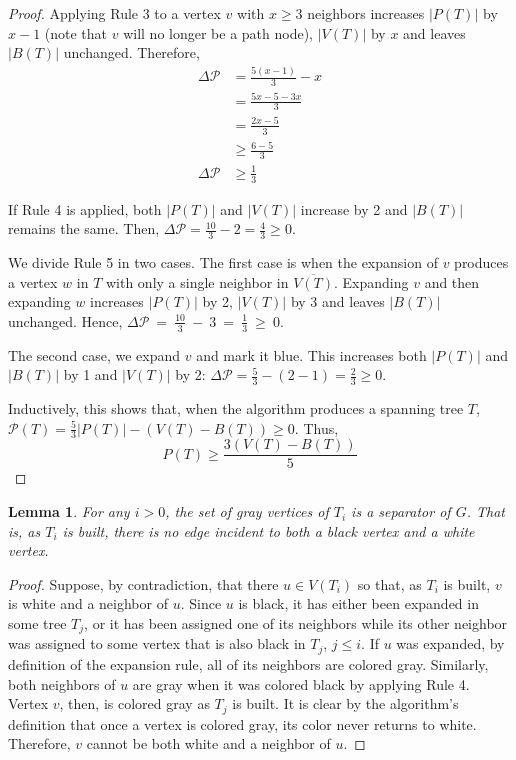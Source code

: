 \documentclass[12pt]{article}
\newtheorem{lemma}[theorem]{Lemma}
\begin{document}
\begin{proof}
  Applying Rule 3 to a vertex $v$ with $x \ge 3$ neighbors increases $|P(T)|$ by $x - 1$ (note that $v$ will no longer be a path node), $|V(T)|$ by $x$ and leaves $|B(T)|$ unchanged.
  Therefore,
  \begin{align*}
    \Delta \mathcal{P} &= \frac{5(x - 1)}{3} - x \\
                       &= \frac{5x - 5 - 3x}{3} \\
                       &= \frac{2x - 5}{3} \\
                       &\ge \frac{6 - 5}{3} \\
    \Delta \mathcal{P} &\ge \frac{1}{3}
  \end{align*}

  If Rule 4 is applied, both $|P(T)|$ and $|V(T)|$ increase by 2 and $|B(T)|$ remains the same.
  Then, $\Delta \mathcal{P} = \frac{10}{3} - 2 = \frac{4}{3} \ge 0$.

  We divide Rule 5 in two cases.
  The first case is when the expansion of $v$ produces a vertex $w$ in $T$ with only a single neighbor in $\overline{V(T)}$.
  Expanding $v$ and then expanding $w$ increases $|P(T)|$ by 2, $|V(T)|$ by 3 and leaves $|B(T)|$ unchanged.
  Hence, $\Delta \mathcal{P}~=~\frac{10}{3}~-~3~=~\frac{1}{3}~\ge~0$.

  The second case, we expand $v$ and mark it blue.
  This increases both $|P(T)|$ and $|B(T)|$ by 1 and $|V(T)|$ by 2: $\Delta \mathcal{P} = \frac{5}{3} - (2 - 1) = \frac{2}{3} \ge 0$.

  Inductively, this shows that, when the algorithm produces a spanning tree $T$, $\mathcal{P}(T) = \frac{5}{3}|P(T)| - (V(T) - B(T)) \ge 0$.
  Thus,
  $$ P(T) \ge \frac{3(V(T) - B(T))}{5} $$

\end{proof}

\begin{lemma} \label{lemma:sep}
  For any $i > 0$, the set of gray vertices of $T_i$ is a separator of $G$.
  That is, as $T_i$ is built, there is no edge incident to both a black vertex and a white vertex.
\end{lemma}

\begin{proof}
  Suppose, by contradiction, that there $u \in V(T_i)$ so that, as $T_i$ is built, $v$ is white and a neighbor of $u$.
  Since $u$ is black, it has either been expanded in some tree $T_j$, or it has been assigned one of its neighbors while its other neighbor was assigned to some vertex that is also black in $T_j$, $j \le i$.
  If $u$ was expanded, by definition of the expansion rule, all of its neighbors are colored gray.
  Similarly, both neighbors of $u$ are gray when it was colored black by applying Rule 4.
  Vertex $v$, then, is colored gray as $T_j$ is built.
  It is clear by the algorithm's definition that once a vertex is colored gray, its color never returns to white.
  Therefore, $v$ cannot be both white and a neighbor of $u$.
\end{proof}
\end{document}
